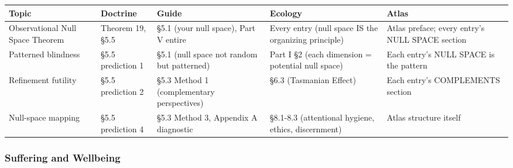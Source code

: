 {\small
\begin{longtable}{>{\raggedright\arraybackslash}p{} >{\raggedright\arraybackslash}p{} >{\raggedright\arraybackslash}p{} >{\raggedright\arraybackslash}p{} >{\raggedright\arraybackslash}p{}}
\toprule
\textbf{Topic} & \textbf{Doctrine} & \textbf{Guide} & \textbf{Ecology} & \textbf{Atlas} \\
\midrule
\endhead
Observational Null Space Theorem & Theorem 19, §5.5 & §5.1 (your null space), Part V entire & Every entry (null space IS the organizing principle) & Atlas preface; every entry's NULL SPACE section \\
Patterned blindness & §5.5 prediction 1 & §5.1 (null space not random but patterned) & Part I §2 (each dimension = potential null space) & Each entry's NULL SPACE is the pattern \\
Refinement futility & §5.5 prediction 2 & §5.3 Method 1 (complementary perspectives) & §6.3 (Tasmanian Effect) & Each entry's COMPLEMENTS section \\
Null-space mapping & §5.5 prediction 4 & §5.3 Method 3, Appendix A diagnostic & §8.1-8.3 (attentional hygiene, ethics, discernment) & Atlas structure itself \\
\bottomrule
\end{longtable}
}



\subsubsection*{Suffering and Wellbeing}



